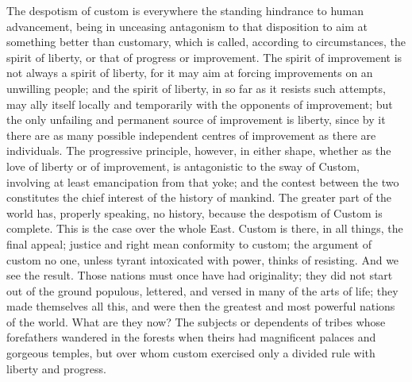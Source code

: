 \documentclass[11pt,openany]{book}
\begin{document}
The despotism of custom is everywhere the standing hindrance to human advancement, being in unceasing antagonism to that disposition to aim at something better than customary, which is called, according to circumstances, the spirit of liberty, or that of progress or improvement. The spirit of improvement is not always a spirit of liberty, for it may aim at forcing improvements on an unwilling people; and the spirit of liberty, in so far as it resists such attempts, may ally itself locally and temporarily with the opponents of improvement; but the only unfailing and permanent source of improvement is liberty, since by it there are as many possible independent centres of improvement as there are individuals. The progressive principle, however, in either shape, whether as the love of liberty or of improvement, is antagonistic to the sway of Custom, involving at least emancipation from that yoke; and the contest between the two constitutes the chief interest of the history of mankind. The greater part of the world has, properly speaking, no history, because the despotism of Custom is complete. This is the case over the whole East. Custom is there, in all things, the final appeal; justice and right mean conformity to custom; the argument of custom no one, unless tyrant intoxicated with power, thinks of resisting. And we see the result. Those nations must once have had originality; they did not start out of the ground populous, lettered, and versed in many of the arts of life; they made themselves all this, and were then the greatest and most powerful nations of the world. What are they now? The subjects or dependents of tribes whose forefathers wandered in the forests when theirs had magnificent palaces and gorgeous temples, but over whom custom exercised only a divided rule with liberty and progress.
\end{document}
